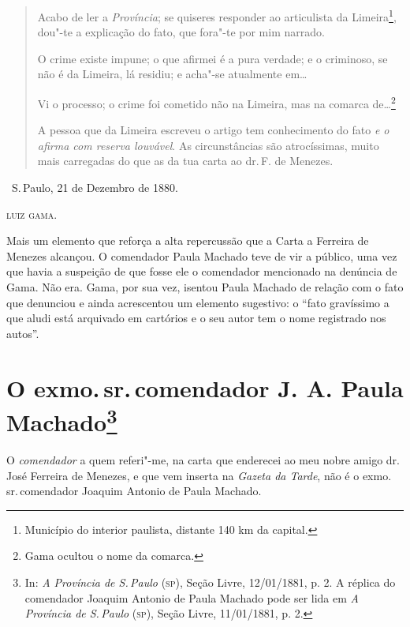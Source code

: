\noindent\dotfill{}

\begin{quote}
Acabo de ler a \emph{Província}; se quiseres responder ao articulista
da Limeira\footnote{Município do interior paulista, distante 140 km da
  capital.}, dou"-te a explicação do fato, que fora"-te por mim narrado.

O crime existe impune; o que afirmei é a pura verdade; e o criminoso, se
não é da Limeira, lá residiu; e acha"-se atualmente em\ldots{}

Vi o processo; o crime foi cometido não na Limeira, mas na comarca
de\ldots{}\footnote{Gama ocultou o nome da comarca.}

A pessoa que da Limeira
escreveu o artigo tem conhecimento do fato \emph{e o afirma com reserva
louvável}. As circunstâncias são atrocíssimas, muito mais carregadas do
que as da tua carta ao dr.\,F. de Menezes.
\end{quote}

\dotfill{}

\hfill\ S.\,Paulo, 21 de Dezembro de 1880.\smallskip

\hfill\textsc{luiz gama.}

\pagebreak
\mbox{}\vfill
\thispagestyle{empty}

{\small\noindent
Mais um elemento que reforça a alta repercussão que a Carta a
Ferreira de Menezes alcançou. O comendador Paula Machado teve de vir a
público, uma vez que havia a suspeição de que fosse ele o comendador
mencionado na denúncia de Gama. Não era. Gama, por sua vez, isentou
Paula Machado de relação com o fato que denunciou e ainda acrescentou um
elemento sugestivo: o ``fato gravíssimo a que aludi está arquivado em
cartórios e o seu autor tem o nome registrado nos autos''. }

\chapter{O exmo.\,sr.\,comendador J. A. Paula Machado\footnote[*]{In:
  \emph{A Província de S.\,Paulo} (\textsc{sp}), Seção Livre, 12/01/1881, p. 2. A
  réplica do comendador Joaquim Antonio de Paula Machado pode ser lida
  em \emph{A Província de S.\,Paulo} (\textsc{sp}), Seção Livre, 11/01/1881, p. 2.}}


O \emph{comendador} a quem referi"-me, na carta que enderecei ao meu
nobre amigo dr.\,José Ferreira de Menezes, e que vem inserta na
\emph{Gazeta da Tarde}, não é o exmo.\,sr.\,comendador Joaquim Antonio de
Paula Machado.

